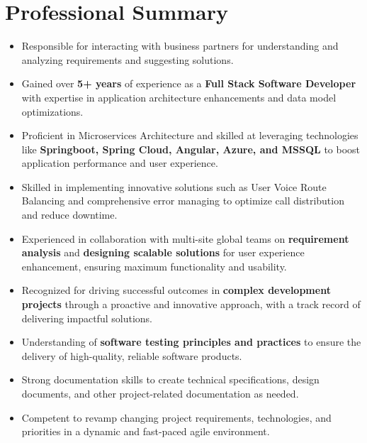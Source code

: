 \section{\textbf{Professional Summary}}
\begin{itemize}
      \small
      \setlength{\itemsep}{0pt}
      \setlength{\parskip}{0pt}
      \setlength{\parsep}{0pt}
      \item Responsible for interacting with business partners for understanding and analyzing requirements and suggesting solutions.
      \item Gained over \textbf{5+ years} of experience as a \textbf{Full Stack Software Developer} with expertise in
            application architecture enhancements and data model optimizations.
      \item Proficient in Microservices Architecture and skilled at leveraging technologies like \textbf{Springboot, Spring Cloud,
                  Angular, Azure, and MSSQL} to boost application performance and user experience.
      \item Skilled in implementing innovative solutions such as User Voice Route Balancing and
            comprehensive error managing to optimize call distribution and reduce downtime.
      \item Experienced in collaboration with multi-site global teams on \textbf{requirement analysis} and \textbf{designing scalable solutions}
            for user experience enhancement, ensuring maximum functionality and usability.
      \item Recognized for driving successful outcomes in \textbf{complex development projects}
            through a proactive and innovative approach, with a track record of delivering
            impactful solutions.
      \item Understanding of \textbf{software testing principles and practices} to ensure the delivery of
            high-quality, reliable software products.
      \item Strong documentation skills to create technical specifications, design documents, and
            other project-related documentation as needed.
      \item Competent to revamp changing project requirements, technologies, and priorities in
            a dynamic and fast-paced agile environment.
\end{itemize}